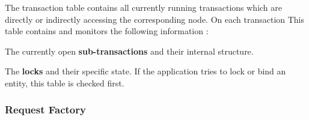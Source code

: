 \documentclass[a4paper, 10pt]{book}
\begin{document}
                                The transaction table contains all currently running transactions
                                which are directly or indirectly accessing the corresponding node. On
                                each transaction This table contains and monitors the following
                                information :
                                \begin{description}
                                    \item The currently open \textbf{sub-transactions} and their internal
                                        structure.
                                    \item The \textbf{locks} and their specific state. If the application
                                        tries to lock or bind an entity, this table is checked first.
                                \end{description}



                                \subsubsection{Request Factory}
                                \label{sec:request-factory}
\end{document}
